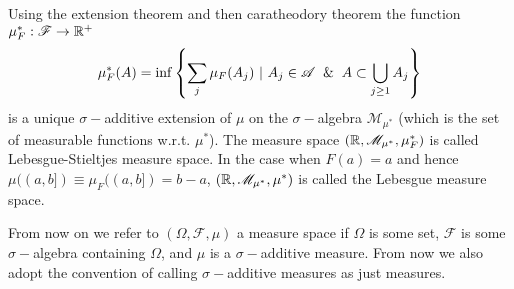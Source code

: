 Using the extension theorem and then caratheodory theorem the function $\mu^*_F: \mathscr{F} \to \mathbb{R}^+$
\[\mu^*_F(A) = \inf\l\{\sum_j \mu_F(A_j)\ |\ A_j \in \mathscr{A} \And A \subset \bigcup_{j\geq1}A_j\r\}\]
is a unique $\sigma-$additive extension of $\mu$ on the $\sigma-$algebra $ \mathscr{M}_{\mu^*}$ (which is the set of measurable functions w.r.t. $\mu^*$). The measure space $(\mathbb{R}, \mathscr{M}_{\mu^*}, \mu_F^*)$ is called Lebesgue-Stieltjes measure space. In the case when $F(a) = a$ and hence $\mu((a,b]) \equiv \mu_F((a,b]) = b-a$, $(\mathbb{R}, \mathscr{M}_{\mu^*}, \mu^*)$ is called the Lebesgue measure space.
\begin{convention*}
  From now on we refer to $(\Omega, \mathscr{F}, \mu)$ a measure space if $\Omega$ is some set, $ \mathscr{F}$ is some $\sigma-$algebra containing $ \Omega$, and $\mu$ is a $\sigma-$additive measure. From now we also adopt the convention of calling $\sigma-$additive measures as just measures. 
\end{convention*}
